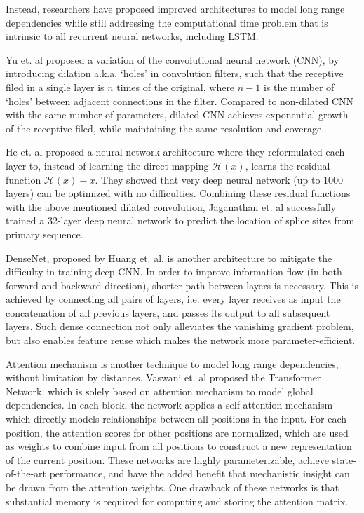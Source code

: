 \documentclass{proposal}
\begin{document}
Instead, researchers have proposed improved architectures to model long range dependencies
while still addressing the computational time problem that is intrinsic to all recurrent neural networks, including LSTM.

Yu et. al\cite{yu2015multi} proposed a variation of the convolutional neural network (CNN),
by introducing dilation a.k.a. `holes' in convolution filters, such that the receptive filed in a single layer is $n$ times of the original,
where $n-1$ is the number of `holes' between adjacent connections in the filter.
Compared to non-dilated CNN with the same number of parameters,
dilated CNN achieves exponential growth of the receptive filed,
while maintaining the same resolution and coverage.


He et. al\cite{he2016deep} proposed a neural network architecture where they reformulated
each layer to, instead of learning the direct mapping $\mathcal{H}(x)$,
learns the residual function $\mathcal{H}(x) - x$.
They showed that very deep neural network (up to $1000$ layers) can be optimized with no difficulties.
Combining these residual functions with the above mentioned dilated convolution,
Jaganathan et. al\cite{jaganathan2019predicting} successfully trained a 32-layer deep neural network to predict
the location of splice sites from primary sequence.


DenseNet, proposed by Huang et. al\cite{huang2017densely}, is another architecture
to mitigate the difficulty in training deep CNN.
In order to improve information flow (in both forward and backward direction),
shorter path between layers is necessary.
This is achieved by connecting all pairs of layers,
i.e. every layer receives as input the concatenation of all previous layers, and passes its output to all subsequent layers.
Such dense connection not only alleviates the vanishing gradient problem, but also enables feature reuse which makes the network more parameter-efficient.



Attention mechanism is another technique to model long range dependencies,
without limitation by distances.
Vaswani et. al\cite{vaswani2017attention} proposed the Transformer Network,
which is solely based on attention mechanism to model global dependencies.
In each block, the network applies a self-attention mechanism
which directly models relationships between all positions in the input.
For each position, the attention scores for other positions are normalized,
which are used as weights to combine input from all positions to construct a new representation of the current position.
These networks are highly parameterizable, achieve state-of-the-art performance,
and have the added benefit that mechanistic insight can be drawn from the attention weights.
One drawback of these networks is that substantial memory is required for computing and storing the attention matrix.
\end{document}
